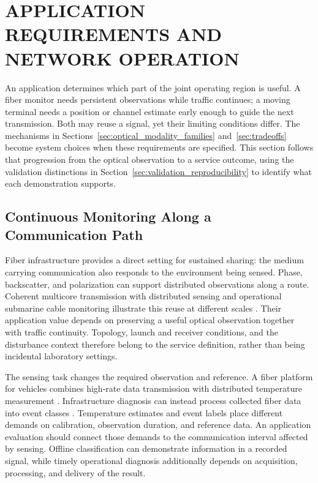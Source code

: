 \section{APPLICATION REQUIREMENTS AND NETWORK OPERATION}
\label{sec:technologies_applications_6g}

An application determines which part of the joint operating region is useful.
A fiber monitor needs persistent observations while traffic continues; a moving
terminal needs a position or channel estimate early enough to guide the next
transmission. Both may reuse a signal, yet their limiting conditions differ.
The mechanisms in Sections~\ref{sec:optical_modality_families}
and~\ref{sec:tradeoffs} become system choices when these requirements are
specified. This section follows that progression from the optical observation
to a service outcome, using the validation distinctions in
Section~\ref{sec:validation_reproducibility} to identify what each demonstration
supports.

\subsection{Continuous Monitoring Along a Communication Path}

Fiber infrastructure provides a direct setting for sustained sharing: the
medium carrying communication also responds to the environment being sensed.
Phase, backscatter, and polarization can support distributed observations
along a route. Coherent multicore transmission with distributed sensing and
operational submarine cable monitoring illustrate this reuse at different
scales \cite{OISAC_SCR00346,OISAC_SCR00957}. Their application value depends on
preserving a useful optical observation together with traffic continuity.
Topology, launch and receiver conditions, and the disturbance context therefore
belong to the service definition, rather than being incidental laboratory
settings.

The sensing task changes the required observation and reference. A fiber
platform for vehicles combines high-rate data transmission with distributed
temperature measurement \cite{OISAC_SCR00123}. Infrastructure diagnosis can
instead process collected fiber data into event classes
\cite{OISAC_SCR01006}. Temperature estimates and event labels place different
demands on calibration, observation duration, and reference data. An application
evaluation should connect those demands to the communication interval affected
by sensing. Offline classification can demonstrate information in a recorded
signal, while timely operational diagnosis additionally depends on acquisition,
processing, and delivery of the result.

